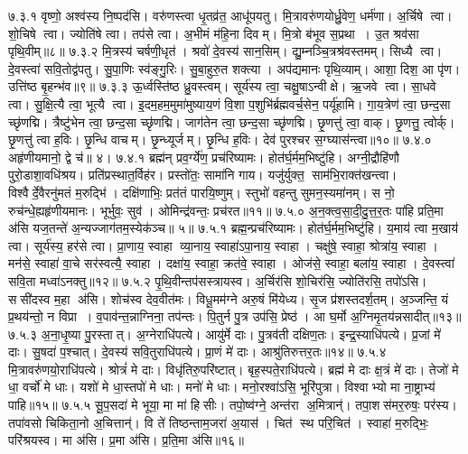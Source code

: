 \anuvakamend
७.३.१
वृष्णो॒ अश्व॑स्य नि॒ष्पद॑सि। वरु॑णस्त्वा धृ॒तव्र॑त॒ आधू॑पयतु। मि॒त्रावरु॑णयोर्ध्रु॒वेण॒ धर्म॑णा। अ॒र्चिषे त्वा। शो॒चिषे त्वा। ज्योति॑षे त्वा। तप॑से त्वा। अ॒भीमं म॑हि॒ना दिवम्। मि॒त्रो ब॑भूव स॒प्रथा। उ॒त श्रव॑सा पृथि॒वीम्॥८॥
७.३.२
मि॒त्रस्य॑ चर्\mbox{}षणी॒धृत॑। श्रवो॑ दे॒वस्य॑ सान॒सिम्। द्यु॒म्नञ्चि॒त्रश्र॑वस्तमम्। सिध्यै त्वा। दे॒वस्त्वा॑ सवि॒तोद्व॑पतु। सु॒पा॒णिः स्व॑ङ्गु॒रिः। सु॒बा॒हुरु॒त शक्त्या। अप॑द्यमानः पृथि॒व्याम्। आशा॒ दिश॒ आ पृ॑ण। उत्ति॑ष्ठ बृ॒हन्भ॑व॥९॥
७.३.३
ऊ॒र्ध्वस्ति॑ष्ठ ध्रु॒वस्त्वम्। सूर्य॑स्य त्वा॒ चक्षु॒षाऽन्वीक्षे। ऋ॒जवे त्वा। सा॒धवे त्वा। सु॒क्षि॒त्यै त्वा॒ भूत्यै त्वा। इ॒दम॒हम॒मुमा॑मुष्याय॒णं  वि॒शा प॒शुभि॑र्ब्रह्मवर्च॒सेन॒ पर्यू॑हामि। गा॒य॒त्रेण॑ त्वा॒ छन्द॒सा च्छृ॑णद्मि। त्रैष्टु॑भेन त्वा॒ छन्द॒सा च्छृ॑णद्मि। जाग॑तेन त्वा॒ छन्द॒सा च्छृ॑णद्मि। छृ॒णत्तु॑ त्वा॒ वाक्। छृ॒णत्तु॒ त्वोर्क्। छृ॒णत्तु॑ त्वा ह॒विः। छृ॒न्धि वाचम्। छृ॒न्ध्यूर्जम्। छृ॒न्धि ह॒विः। देव॑ पुरश्चर स॒ग्घ्यास॑न्त्वा॥१०॥
७.४.०
अहृ॑णीयमानो॒ द्वे च॑॥ ४।
\anuvakamend
७.४.१
ब्रह्म॑न् प्रव॒र्ग्ये॑ण॒ प्रच॑रिष्यामः। होत॑र्घ॒र्मम॒भिष्टु॑हि। अग्नी॒द्रौहि॑णौ पुरो॒डाशा॒वधि॑श्रय। प्रति॑प्रस्थात॒र्विह॑र। प्रस्तो॑तः॒ सामा॑नि गाय। यजु॑र्युक्त॒ साम॑भि॒राक्त॑खन्त्वा। विश्वैर्दे॒वैरनु॑मतं म॒रुद्भि॑। दक्षि॑णाभिः॒ प्रत॑तं पारयि॒ष्णुम्। स्तुभो॑ वहन्तु सुमन॒स्यमा॑नम्। स नो॒ रुच॑न्धे॒ह्यहृ॑णीयमानः। भूर्भुवः॒ सुव॑। ओमिन्द्र॑वन्तः॒ प्रच॑रत॥११॥
७.५.०
अ॒न॒क्त्व॒सा॒दी॒दु॒त्त॒र॒तः पा॑हि प्रति॒मा अ॑सि यज॒तन्ते॑ अ॒न्यज्जाग॑तम॒स्येक॑ञ्च॥ ५॥
\anuvakamend
७.५.१
ब्रह्म॒न्प्रच॑रिष्यामः। होत॑र्घ॒र्मम॒भिष्टु॑हि। य॒माय॑ त्वा म॒खाय॑ त्वा। सूर्य॑स्य॒ हर॑से त्वा। प्रा॒णाय॒ स्वाहा व्या॒नाय॒ स्वाहा॑ऽपा॒नाय॒ स्वाहा। चक्षु॑षे॒ स्वाहा॒ श्रोत्रा॑य॒ स्वाहा। मन॑से॒ स्वाहा॑ वा॒चे सर॑स्वत्यै॒ स्वाहा। दक्षा॑य॒ स्वाहा॒ क्रत॑वे॒ स्वाहा। ओज॑से॒ स्वाहा॒ बला॑य॒ स्वाहा। दे॒वस्त्वा॑ सवि॒ता मध्वा॑ऽनक्तु॥१२॥
७.५.२
पृ॒थि॒वीन्तप॑सस्त्रायस्व। अ॒र्चिर॑सि शो॒चिर॑सि॒ ज्योति॑रसि॒ तपो॑ऽसि। ससी॑दस्व म॒हा अ॑सि। शोच॑स्व देव॒वीत॑मः। विधू॒मम॑ग्ने अरु॒षं मि॑येध्य। सृ॒ज प्र॑शस्तदर्\mbox{}श॒तम्। अ॒ञ्जन्ति॒ यं प्र॒थय॑न्तो॒ न विप्रा। व॒पाव॑न्त॒न्नाग्निना॒ तप॑न्तः। पि॒तुर्न पु॒त्र उप॑सि॒ प्रेष्ठ॑। आ घ॒र्मो अ॒ग्निमृ॒तय॑न्नसादीत्॥१३॥
७.५.३
अ॒ना॒धृ॒ष्या पु॒रस्तात्। अ॒ग्नेराधि॑पत्ये। आयु॑र्मे दाः। पु॒त्रव॑ती दक्षिण॒तः। इन्द्र॒स्याधि॑पत्ये। प्र॒जां मे॑ दाः। सु॒षदा॑ प॒श्चात्। दे॒वस्य॑ सवि॒तुराधि॑पत्ये। प्रा॒णं मे॑ दाः। आश्रु॑तिरुत्तर॒तः॥१४॥
७.५.४
मि॒त्रावरु॑णयो॒राधि॑पत्ये। श्रोत्रं॑ मे दाः। विधृ॑तिरु॒परि॑ष्टात्। बृह॒स्पते॒राधि॑पत्ये। ब्रह्म॑ मे दाः क्ष॒त्रं मे॑ दाः। तेजो॑ मे धा॒ वर्चो॑ मे धाः। यशो॑ मे धा॒स्तपो॑ मे धाः। मनो॑ मे धाः। मनो॒रश्वा॑ऽसि॒ भूरि॑पुत्रा। विश्वाभ्यो मा ना॒ष्ट्राभ्य॑ पाहि॥१५॥
७.५.५
सू॒प॒सदा॑ मे भूया॒ मा मा॑ हिसीः। तपो॒ष्व॑ग्ने॒ अन्त॑रा अ॒मित्रान्॑। तपा॒शस॑मर॒रुषः॒ पर॑स्य। तपा॑वसो चिकिता॒नो अ॒चित्तान्॑। वि ते॑ तिष्ठन्ताम॒जरा॑ अ॒यास॑। चित॑ स्थ परि॒चित॑। स्वाहा॑ म॒रुद्भिः॒ परि॑श्रयस्व। मा अ॑सि। प्र॒मा अ॑सि। प्र॒ति॒मा अ॑सि॥१६॥
